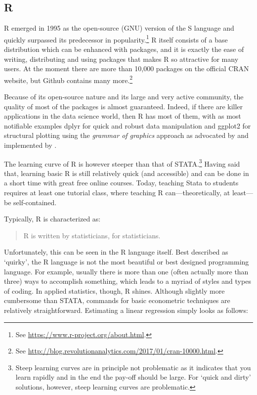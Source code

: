\documentclass[fleqn,10pt]{SelfArx} %
\begin{document}
\subsection*{R}

R emerged in 1995 as the open-source (GNU) version of the S language and quickly surpassed its predecessor in popularity.\footnote{See \href{https://www.r-project.org/about.html}{https://www.r-project.org/about.html}.} R itself consists of a base distribution which can be enhanced with packages, and it is exactly the ease of writing, distributing and using packages that makes R so attractive for many users. At the moment there are more than 10,000 packages on the official CRAN website, but Github contains many more.\footnote{See \href{http://blog.revolutionanalytics.com/2017/01/cran-10000.html}{http://blog.revolutionanalytics.com/2017/01/cran-10000.html}.}

Because of its open-source nature and its large and very active community, the quality of most of the packages is almost guaranteed. Indeed, if there are killer applications in the data science world, then R has most of them, with as most notifiable examples dplyr for quick and robust data manipulation and ggplot2 for structural plotting using the \textit{grammar of graphics} approach as advocated by \citet{wilkinson2006grammar} and implemented by \citet{wickham2013implementation}. 

The learning curve of R is however steeper than that of STATA.\footnote{Steep learning curves are in principle not problematic as it indicates that you learn rapidly and in the end the pay-off should be large. For `quick and dirty' solutions, however, steep learning curves are problematic.} Having said that, learning basic R is still relatively quick (and accessible) and can be done in a short time with great free online courses. Today, teaching Stata to students requires at least one tutorial class, where teaching R can---theoretically, at least--- be self-contained. 

Typically, R is characterized as:
\begin{quote}
	R is written by statisticians, for statisticians.
\end{quote}
Unfortunately, this can be seen in the R language itself. Best described as `quirky', the R language is not the most beautiful or best designed programming language. For example, usually there is more than one (often actually more than three) ways to accomplish something, which leads to a myriad of styles and types of coding. In applied statistics, though, R shines. Although slightly more cumbersome than STATA, commands for basic econometric techniques are relatively straightforward. Estimating a linear regression simply looks as follows:
\end{document}
